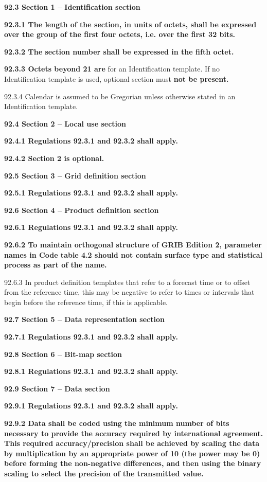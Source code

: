 \textbf{92.3 Section 1 -- Identification section}

\textbf{92.3.1 The length of the section, in units of octets, shall be expressed over the group of the first four octets, i.e. over the first 32 bits.}

\textbf{92.3.2 The section number shall be expressed in the fifth octet.}

\textbf{92.3.3 Octets beyond 21 are} for an Identification template. If no Identification template is used, optional section must \textbf{not be present.}

92.3.4 Calendar is assumed to be Gregorian unless otherwise stated in an Identification template.

\textbf{92.4 Section 2 -- Local use section}

\textbf{92.4.1 Regulations 92.3.1 and 92.3.2 shall apply.}

\textbf{92.4.2 Section 2 is optional.}

\textbf{92.5 Section 3 -- Grid definition section}

\textbf{92.5.1 Regulations 92.3.1 and 92.3.2 shall apply.}

\textbf{92.6 Section 4 -- Product definition section}

\textbf{92.6.1 Regulations 92.3.1 and 92.3.2 shall apply.}

\textbf{92.6.2 To maintain orthogonal structure of GRIB Edition 2, parameter names in Code table 4.2 should not contain surface type and statistical process as part of the name.}

92.6.3 In product definition templates that refer to a forecast time or to offset from the reference time, this may be negative to refer to times or intervals that begin before the reference time, if this is applicable.

\textbf{92.7 Section 5 -- Data representation section}

\textbf{92.7.1 Regulations 92.3.1 and 92.3.2 shall apply.}

\textbf{92.8 Section 6 -- Bit-map section}

\textbf{92.8.1 Regulations 92.3.1 and 92.3.2 shall apply.}

\textbf{92.9 Section 7 -- Data section}

\textbf{92.9.1 Regulations 92.3.1 and 92.3.2 shall apply.}

\textbf{92.9.2 Data shall be coded using the minimum number of bits necessary to provide the accuracy required by international agreement. This required accuracy/precision shall be achieved by scaling the data by multiplication by an appropriate power of 10 (the power may be 0) before forming the non-negative differences, and then using the binary scaling to select the precision of the transmitted value.}

